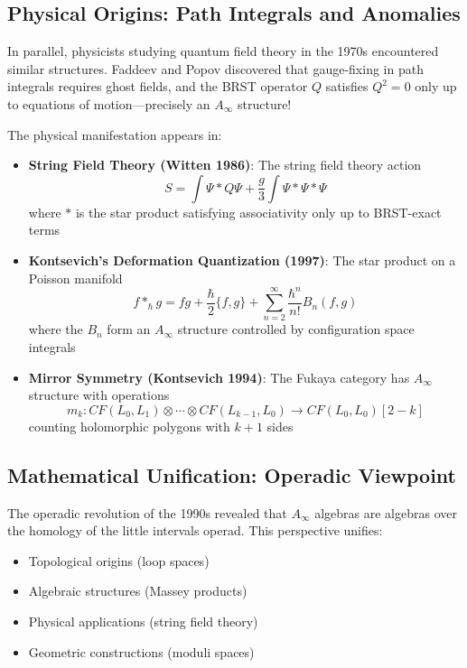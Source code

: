 \subsection{Physical Origins: Path Integrals and Anomalies}

In parallel, physicists studying quantum field theory in the 1970s encountered similar structures. Faddeev and Popov discovered that gauge-fixing in path integrals requires ghost fields, and the BRST operator $Q$ satisfies $Q^2 = 0$ only up to equations of motion—precisely an $A_\infty$ structure!

The physical manifestation appears in:
\begin{itemize}
\item \textbf{String Field Theory (Witten 1986)}: The string field theory action
$$S = \int \Psi * Q\Psi + \frac{g}{3}\int \Psi * \Psi * \Psi$$
where $*$ is the star product satisfying associativity only up to BRST-exact terms

\item \textbf{Kontsevich's Deformation Quantization (1997)}: The star product on a Poisson manifold
$$f *_\hbar g = fg + \frac{\hbar}{2}\{f,g\} + \sum_{n=2}^\infty \frac{\hbar^n}{n!}B_n(f,g)$$
where the $B_n$ form an $A_\infty$ structure controlled by configuration space integrals

\item \textbf{Mirror Symmetry (Kontsevich 1994)}: The Fukaya category has $A_\infty$ structure with operations
$$m_k: CF(L_0,L_1) \otimes \cdots \otimes CF(L_{k-1},L_0) \to CF(L_0,L_0)[2-k]$$
counting holomorphic polygons with $k+1$ sides
\end{itemize}

\subsection{Mathematical Unification: Operadic Viewpoint}

The operadic revolution of the 1990s revealed that $A_\infty$ algebras are algebras over the homology of the little intervals operad. This perspective unifies:
\begin{itemize}
\item Topological origins (loop spaces)
\item Algebraic structures (Massey products)
\item Physical applications (string field theory)
\item Geometric constructions (moduli spaces)
\end{itemize}

